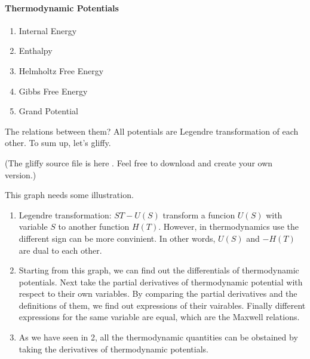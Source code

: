 \documentclass[letterpaper,10pt,english]{sphinxmanual}
\begin{document}

\paragraph{Thermodynamic Potentials}
\label{vocabulary/vocabulary:thermodynamic-potentials}\label{vocabulary/vocabulary:index-3}\begin{enumerate}
\item {} 
Internal Energy

\item {} 
Enthalpy

\item {} 
Helmholtz Free Energy

\item {} 
Gibbs Free Energy

\item {} 
Grand Potential

\end{enumerate}

The relations between them? All potentials are Legendre transformation of each other. To sum up, let's gliffy.


(The gliffy source file is here . Feel free to download and create your own version.)

This graph needs some illustration.
\begin{enumerate}
\item {} 
Legendre transformation: $ST-U(S)$ transform a funcion $U(S)$ with variable $S$ to another function $H(T)$. However, in thermodynamics use the different sign can be more convinient. In other words, $U(S)$ and $-H(T)$ are dual to each other.

\item {} 
Starting from this graph, we can find out the differentials of thermodynamic potentials. Next take the partial derivatives of thermodynamic potential with respect to their own variables. By comparing the partial derivatives and the definitions of them, we find out expressions of their vairables. Finally different expressions for the same variable are equal, which are the Maxwell relations.

\item {} 
As we have seen in 2, all the thermodynamic quantities can be obstained by taking the derivatives of thermodynamic potentials.

\end{enumerate}
\end{document}
